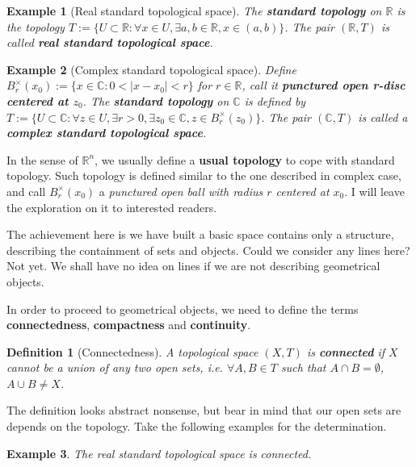 \documentclass[12pt]{article}
\newtheorem{definition}{Definition}[section]
\newtheorem*{example}{Example}
\begin{document}
    \begin{example}[Real standard topological space]
        The \textbf{standard topology} on $\mathbb{R}$ is the topology $T:=\{U\subset \mathbb{R}: \forall x\in U, \exists a,b\in\mathbb{R}, x\in (a,b)\}$. The pair $(\mathbb{R},T)$ is called \textbf{real standard topological space}.
    \end{example}

    \begin{example}[Complex standard topological space]
        Define $B_r^{\times}(x_0):=\{x\in\mathbb{C}:0< |x-x_0| < r\}$ for $r\in\mathbb{R}$, call it \textbf{punctured open r-disc centered at $z_0$}. The \textbf{standard topology} on $\mathbb{C}$ is defined by $T:=\{U\subset\mathbb{C}:\forall z\in U, \exists r>0, \exists z_0\in\mathbb{C}, z\in B_r^{\times}(z_0)\}$. The pair $(\mathbb{C},T)$ is called a \textbf{complex standard topological space}.
    \end{example}

    In the sense of $\mathbb{R}^n$, we usually define a \textbf{usual topology} to cope with standard topology. Such topology is defined similar to the one described in complex case, and call $B_r^{\times}(x_0)$ a \textit{punctured open ball with radius $r$ centered at $x_0$}. I will leave the exploration on it to interested readers.

    The achievement here is we have built a basic space contains only a structure, describing the containment of sets and objects. Could we consider any lines here? Not yet. We shall have no idea on lines if we are not describing geometrical objects.

    In order to proceed to geometrical objects, we need to define the terms \textbf{connectedness}, \textbf{compactness} and \textbf{continuity}.

    \begin{definition}[Connectedness]
        A topological space $(X,T)$ is \textbf{connected} if $X$ cannot be a union of any two open sets, i.e. $\forall A,B \in T$ such that $A\cap B=\emptyset$, $A\cup B\neq X$.
    \end{definition}

    The definition looks abstract nonsense, but bear in mind that our open sets are depends on the topology. Take the following examples for the determination.

    \begin{example}
        The real standard topological space is connected.
    \end{example}
\end{document}
